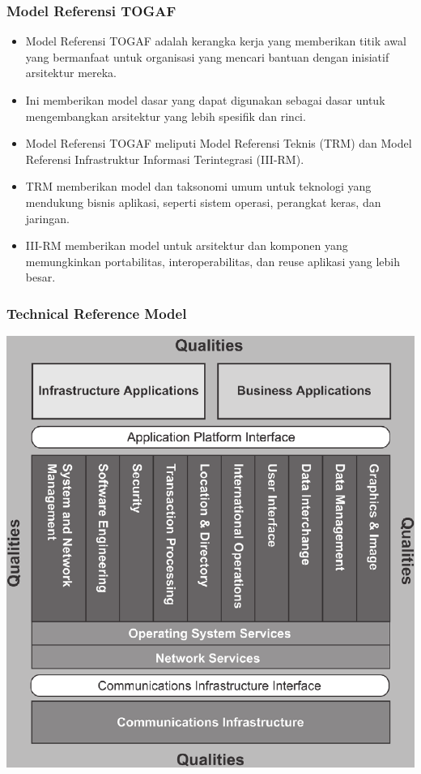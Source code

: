 \documentclass[aspectratio=169]{beamer}
\begin{document}
	
	\begin{frame}
		\frametitle{Model Referensi TOGAF}
		\begin{itemize}
			\item Model Referensi TOGAF adalah kerangka kerja yang memberikan titik awal yang bermanfaat untuk organisasi yang mencari bantuan dengan inisiatif arsitektur mereka.
			\item Ini memberikan model dasar yang dapat digunakan sebagai dasar untuk mengembangkan arsitektur yang lebih spesifik dan rinci.
			\item Model Referensi TOGAF meliputi Model Referensi Teknis (TRM) dan Model Referensi Infrastruktur Informasi Terintegrasi (III-RM).
			\item TRM memberikan model dan taksonomi umum untuk teknologi yang mendukung bisnis aplikasi, seperti sistem operasi, perangkat keras, dan jaringan.
			\item III-RM memberikan model untuk arsitektur dan komponen yang memungkinkan portabilitas, interoperabilitas, dan reuse aplikasi yang lebih besar.
		\end{itemize}
	\end{frame}
	
	{
		\begin{frame}
			\frametitle{Technical Reference Model}
			\begin{center}
				\includegraphics[width=.53\textwidth]{../figures/detailed_technical_reference_model}
			\end{center}
		\end{frame}
	}
	
\end{document}
